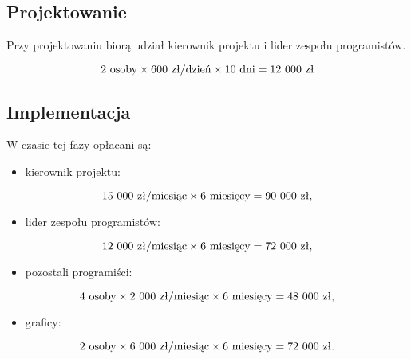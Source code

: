\documentclass [11pt, a4paper, leqno] {article}
\begin{document}
\subsection{Projektowanie}
\noindent
Przy projektowaniu biorą udział kierownik projektu i lider zespołu programistów.

\begin{equation}2 \text{ osoby} \times 600 \text{ zł/dzień} \times 10 \text{ dni} = 12\\\ 000 \text{ zł} \end{equation}

\subsection{Implementacja}
\noindent
W czasie tej fazy opłacani są:
\begin{itemize}
\item kierownik projektu: 
\end{itemize}
\begin{equation}15\\\ 000 \text{ zł/miesiąc} \times 6 \text{ miesięcy} = 90\\\ 000 \text{ zł,} \end{equation}

\begin{itemize}
\item lider zespołu programistów: 
\end{itemize}
\begin{equation}12\\\ 000 \text{ zł/miesiąc} \times 6 \text{ miesięcy} = 72\\\ 000 \text{ zł,} \end{equation}

\begin{itemize}
\item pozostali programiści: 
\end{itemize}
\begin{equation}4 \text{ osoby} \times 2\\\ 000 \text{ zł/miesiąc} \times 6 \text{ miesięcy} = 48\\\ 000 \text{ zł,} \end{equation}

\begin{itemize}
\item graficy: 
\end{itemize}
\begin{equation}2 \text{ osoby} \times 6\\\ 000 \text{ zł/miesiąc} \times 6 \text{ miesięcy} = 72\\\ 000 \text{ zł.} \end{equation}
\end{document}
